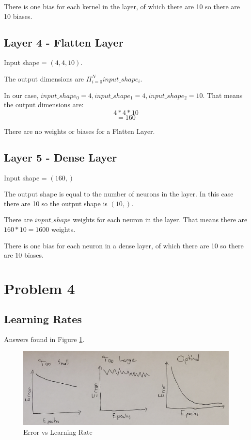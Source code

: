 \documentclass[12pt]{article}
\begin{document}
There is one bias for each kernel in the layer, of which there are 10 so there are 10 biases.


\subsection{Layer 4 - Flatten Layer}

Input shape = $(4, 4, 10)$.

The output dimensions are $\Pi_{i=0}^{N} input\_shape_i$.

In our case, $input\_shape_0 = 4, input\_shape_1 = 4, input\_shape_2 = 10$.
That means the output dimensions are:
$$
 4 * 4 * 10
$$
$$
= 160
$$

There are no weights or biases for a Flatten Layer.


\subsection{Layer 5 - Dense Layer}

Input shape = $(160,)$

The output shape is equal to the number of neurons in the layer.
In this case there are 10 so the output shape is $(10,)$.

There are $input\_shape$ weights for each neuron in the layer.
That means there are $160 * 10 = 1600$ weights.

There is one bias for each neuron in a dense layer, of which there are 10 so there are 10 biases.


\section{Problem 4}

\subsection{Learning Rates}

Answers found in Figure \ref{fig:error}.

\begin{figure}[!htb]
  \centering
  \includegraphics[width=\textwidth]{error.jpg}
  \caption{Error vs Learning Rate}
  \label{fig:error}
\end{figure}
\end{document}
